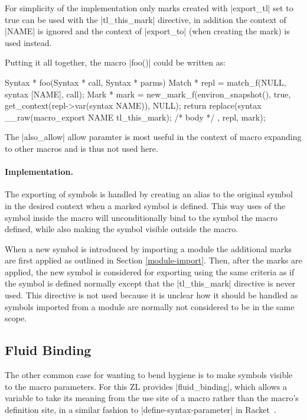 For simplicity of the implementation only marks created with
|export_tl| set to true can be used with the |tl_this_mark| directive,
in addition the context of |NAME| is ignored and the context of
|export_to| (when creating the mark) is used instead.

Putting it all together, the macro |foo()| could be written as:
\begin{code}
Syntax * foo(Syntax * call, Syntax * parms) {
  Match * repl = match_f(NULL, syntax [NAME], call);
  Mark * mark = new_mark_f(environ_snapshot(), true, 
                           get_context(repl->var(syntax NAME)), NULL);
  return replace(syntax {
    __raw(macro_export NAME tl_this_mark);
    /* body */
  }, repl, mark);
}
\end{code}
The |also_allow| allow paramter is most useful in the context of macro
expanding to other macros and is thus not used here.

\paragraph{Implementation.}

The exporting of symbols is handled by creating an alias to the
original symbol in the desired context when a marked symbol is
defined.  This way uses of the symbol inside the macro will
unconditionally bind to the symbol the macro defined, while also making the
symbol visible outside the macro.  

When a new symbol is introduced by importing a module the additional
marks are first applied as outlined in Section \ref{module-import}.
Then, after the marks are applied, the new symbol is considered for
exporting using the same criteria as if the symbol is defined normally
except that the |tl_this_mark| directive is never used.  This
directive is not used because it is unclear how it
should be handled as symbols imported from a module are
normally not considered to be in the same scope.

\subsection{Fluid Binding}
\label{fluid}

The other common case for wanting to bend hygiene is to make symbols
visible to the macro parameters.  For this ZL provides
|fluid_binding|, which allows a variable to take its meaning from the
use site of a macro rather than the macro's definition site, in a
similar fashion to |define-syntax-parameter| in Racket~\cite{plt-tr1,
  syn-parm}.


